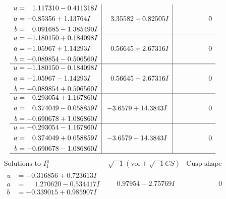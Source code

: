 \documentclass[1p]{elsarticle_modified}
\theoremstyle{definition}
\newcommand{\I}{\sqrt{-1}}
\begin{document}
$$\begin{array}{c|c|c}
\begin{aligned}
u &= \phantom{-}1.117310 - 0.411318 I \\
a &= -0.85356 + 1.13764 I \\
b &= \phantom{-}0.091685 - 1.385490 I\end{aligned}
 & \phantom{-}3.35582 - 0.82505 I & \phantom{-0.000000 } 0 \\ \hline\begin{aligned}
u &= -1.180150 + 0.184098 I \\
a &= -1.05967 + 1.14293 I \\
b &= -0.089854 - 0.506560 I\end{aligned}
 & \phantom{-}0.56645 + 2.67316 I & \phantom{-0.000000 } 0 \\ \hline\begin{aligned}
u &= -1.180150 - 0.184098 I \\
a &= -1.05967 - 1.14293 I \\
b &= -0.089854 + 0.506560 I\end{aligned}
 & \phantom{-}0.56645 - 2.67316 I & \phantom{-0.000000 } 0 \\ \hline\begin{aligned}
u &= -0.293054 + 1.167860 I \\
a &= \phantom{-}0.374049 - 0.058859 I \\
b &= -0.690678 + 1.086860 I\end{aligned}
 & -3.6579 + 14.3843 I & \phantom{-0.000000 } 0 \\ \hline\begin{aligned}
u &= -0.293054 - 1.167860 I \\
a &= \phantom{-}0.374049 + 0.058859 I \\
b &= -0.690678 - 1.086860 I\end{aligned}
 & -3.6579 - 14.3843 I & \phantom{-0.000000 } 0\\
 \hline 
 \end{array}$$\newpage$$\begin{array}{c|c|c}  
\text{Solutions to }I^u_{1}& \I (\text{vol} + \sqrt{-1}CS) & \text{Cusp shape}\\
 \hline 
\begin{aligned}
u &= -0.316856 + 0.723613 I \\
a &= \phantom{-}1.270620 - 0.534417 I \\
b &= -0.339015 + 0.985907 I\end{aligned}
 & \phantom{-}0.97954 - 2.75769 I & \phantom{-0.000000 } 0 \\ \hline\begin{aligned}

\end{aligned}
\end{array}$$
\end{document}
